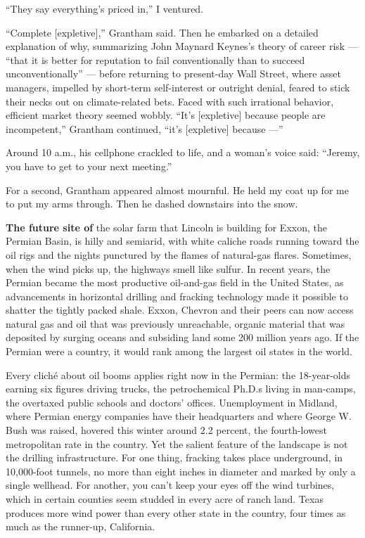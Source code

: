 ``They say everything's priced in,'' I ventured.

``Complete {[}expletive{]},'' Grantham said. Then he embarked on a
detailed explanation of why, summarizing John Maynard Keynes's theory of
career risk --- ``that it is better for reputation to fail
conventionally than to succeed unconventionally'' --- before returning
to present-day Wall Street, where asset managers, impelled by short-term
self-interest or outright denial, feared to stick their necks out on
climate-related bets. Faced with such irrational behavior, efficient
market theory seemed wobbly. ``It's {[}expletive{]} because people are
incompetent,'' Grantham continued, ``it's {[}expletive{]} because ---''

Around 10 a.m., his cellphone crackled to life, and a woman's voice
said: ``Jeremy, you have to get to your next meeting.''

For a second, Grantham appeared almost mournful. He held my coat up for
me to put my arms through. Then he dashed downstairs into the snow.

\textbf{The future site of} the solar farm that Lincoln is building for
Exxon, the Permian Basin, is hilly and semiarid, with white caliche
roads running toward the oil rigs and the nights punctured by the flames
of natural-gas flares. Sometimes, when the wind picks up, the highways
smell like sulfur. In recent years, the Permian became the most
productive oil-and-gas field in the United States, as advancements in
horizontal drilling and fracking technology made it possible to shatter
the tightly packed shale. Exxon, Chevron and their peers can now access
natural gas and oil that was previously unreachable, organic material
that was deposited by surging oceans and subsiding land some 200 million
years ago. If the Permian were a country, it would rank among the
largest oil states in the world.

Every cliché about oil booms applies right now in the Permian: the
18-year-olds earning six figures driving trucks, the petrochemical
Ph.D.s living in man-camps, the overtaxed public schools and doctors'
offices. Unemployment in Midland, where Permian energy companies have
their headquarters and where George W. Bush was raised, hovered this
winter around 2.2 percent, the fourth-lowest metropolitan rate in the
country. Yet the salient feature of the landscape is not the drilling
infrastructure. For one thing, fracking takes place underground, in
10,000-foot tunnels, no more than eight inches in diameter and marked by
only a single wellhead. For another, you can't keep your eyes off the
wind turbines, which in certain counties seem studded in every acre of
ranch land. Texas produces more wind power than every other state in the
country, four times as much as the runner-up, California.

